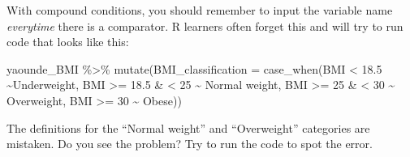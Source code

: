 \documentclass[
  letterpaper,
  DIV=11,
  numbers=noendperiod]{scrreprt}
\newenvironment{Shaded}{\begin{snugshade}}{\end{snugshade}}
\newcommand{\AttributeTok}[1]{\textcolor[rgb]{0.40,0.45,0.13}{#1}}
\newcommand{\DecValTok}[1]{\textcolor[rgb]{0.68,0.00,0.00}{#1}}
\newcommand{\ErrorTok}[1]{\textcolor[rgb]{0.68,0.00,0.00}{#1}}
\newcommand{\FloatTok}[1]{\textcolor[rgb]{0.68,0.00,0.00}{#1}}
\newcommand{\FunctionTok}[1]{\textcolor[rgb]{0.28,0.35,0.67}{#1}}
\newcommand{\NormalTok}[1]{\textcolor[rgb]{0.00,0.23,0.31}{#1}}
\newcommand{\SpecialCharTok}[1]{\textcolor[rgb]{0.37,0.37,0.37}{#1}}
\newcommand{\StringTok}[1]{\textcolor[rgb]{0.13,0.47,0.30}{#1}}
\begin{document}
\begin{tcolorbox}[enhanced jigsaw, titlerule=0mm, colback=white, left=2mm, breakable, opacitybacktitle=0.6, colbacktitle=quarto-callout-caution-color!10!white, colframe=quarto-callout-caution-color-frame, bottomtitle=1mm, opacityback=0, coltitle=black, arc=.35mm, toptitle=1mm, title=\textcolor{quarto-callout-caution-color}{\faFire}\hspace{0.5em}{Watch Out}, leftrule=.75mm, toprule=.15mm, bottomrule=.15mm, rightrule=.15mm]

With compound conditions, you should remember to input the variable name
\emph{everytime} there is a comparator. R learners often forget this and
will try to run code that looks like this:

\begin{Shaded}
\begin{Highlighting}[]
\NormalTok{yaounde\_BMI }\SpecialCharTok{\%\textgreater{}\%}
  \FunctionTok{mutate}\NormalTok{(}\AttributeTok{BMI\_classification =} \FunctionTok{case\_when}\NormalTok{(BMI }\SpecialCharTok{\textless{}} \FloatTok{18.5} \SpecialCharTok{\textasciitilde{}}\StringTok{\textquotesingle{}Underweight\textquotesingle{}}\NormalTok{,}
\NormalTok{                                        BMI }\SpecialCharTok{\textgreater{}=} \FloatTok{18.5} \SpecialCharTok{\&} \ErrorTok{\textless{}} \DecValTok{25} \SpecialCharTok{\textasciitilde{}} \StringTok{\textquotesingle{}Normal weight\textquotesingle{}}\NormalTok{,}
\NormalTok{                                        BMI }\SpecialCharTok{\textgreater{}=} \DecValTok{25} \SpecialCharTok{\&} \ErrorTok{\textless{}} \DecValTok{30} \SpecialCharTok{\textasciitilde{}} \StringTok{\textquotesingle{}Overweight\textquotesingle{}}\NormalTok{,}
\NormalTok{                                        BMI }\SpecialCharTok{\textgreater{}=} \DecValTok{30} \SpecialCharTok{\textasciitilde{}} \StringTok{\textquotesingle{}Obese\textquotesingle{}}\NormalTok{))}
\end{Highlighting}
\end{Shaded}

The definitions for the ``Normal weight'' and ``Overweight'' categories
are mistaken. Do you see the problem? Try to run the code to spot the
error.

\end{tcolorbox}
\end{document}
